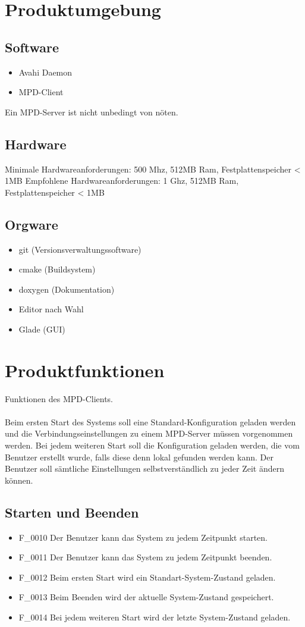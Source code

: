 \section{Produktumgebung}
\subsection{Software}
\begin{itemize}
	\item Avahi Daemon
	\item MPD-Client
\end{itemize}
Ein MPD-Server ist nicht unbedingt von nöten.
\subsection{Hardware}
Minimale Hardwareanforderungen: 500 Mhz, 512MB Ram, Festplattenspeicher < 1MB
Empfohlene Hardwareanforderungen: 1 Ghz, 512MB Ram, Festplattenspeicher < 1MB
\subsection{Orgware}
\begin{itemize}
	\item git (Versionsverwaltungssoftware)
	\item cmake (Buildsystem)
	\item doxygen (Dokumentation)
	\item Editor nach Wahl
	\item Glade (GUI)
\end{itemize}
\section{Produktfunktionen}
Funktionen des MPD-Clients.\ \\ \\
Beim ersten Start des Systems soll eine Standard-Konfiguration geladen werden und die Verbindungseinstellungen
zu einem MPD-Server müssen vorgenommen werden. Bei jedem weiteren Start soll die Konfiguration geladen werden,
die vom Benutzer erstellt wurde, falls diese denn lokal gefunden werden kann. Der Benutzer soll sämtliche
Einstellungen selbstverständlich zu jeder Zeit ändern können.
\subsection{Starten und Beenden}
\begin{itemize}
	\item F\_0010 Der Benutzer kann das System zu jedem Zeitpunkt starten.
	\item F\_0011 Der Benutzer kann das System zu jedem Zeitpunkt beenden.
	\item F\_0012 Beim ersten Start wird ein Standart-System-Zustand geladen.
	\item F\_0013 Beim Beenden wird der aktuelle System-Zustand gespeichert.
	\item F\_0014 Bei jedem weiteren Start wird der letzte System-Zustand geladen.
\end{itemize}
